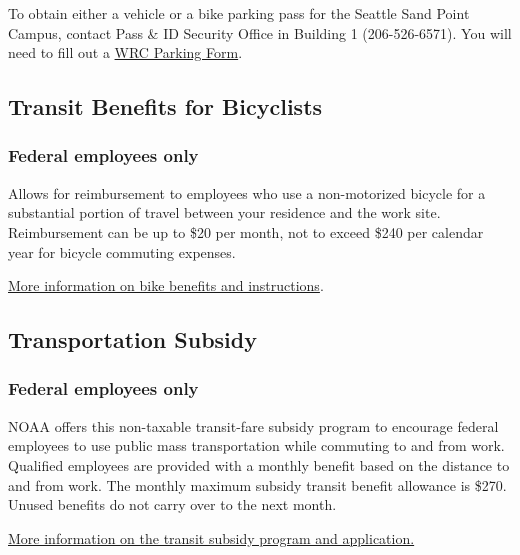 \documentclass[
  letterpaper,
  DIV=11,
  numbers=noendperiod]{scrreprt}
\begin{document}
To obtain either a vehicle or a bike parking pass for the Seattle Sand
Point Campus, contact Pass \& ID Security Office in Building 1
(206-526-6571). You will need to fill out a
\href{http://www.google.com/url?q=http\%3A\%2F\%2Fwww.wrc.noaa.gov\%2Fforms\%2FWRC\%2520Parking\%2520Decal\%2520v2008a.pdf&sa=D&sntz=1&usg=AOvVaw2YdnFqmKoV029T-pt6UwFj}{WRC
Parking Form}.

\subsection{Transit Benefits for
Bicyclists}\label{transit-benefits-for-bicyclists}

\subsubsection{Federal employees only}\label{federal-employees-only}

Allows for reimbursement to employees who use a non-motorized bicycle
for a substantial portion of travel between your residence and the work
site. Reimbursement can be up to \$20 per month, not to exceed \$240 per
calendar year for bicycle commuting expenses.

\href{https://sites.google.com/noaa.gov/cao/about-ocao/logistics-operations-division/noaa-transit-subsidy-program}{More
information on bike benefits and instructions}.

\subsection{Transportation Subsidy}\label{transportation-subsidy}

\subsubsection{Federal employees only}\label{federal-employees-only-1}

NOAA offers this non-taxable transit-fare subsidy program to encourage
federal employees to use public mass transportation while commuting to
and from work. Qualified employees are provided with a monthly benefit
based on the distance to and from work. The monthly maximum subsidy
transit benefit allowance is \$270. Unused benefits do not carry over to
the next month.

\href{https://sites.google.com/noaa.gov/cao/about-ocao/logistics-operations-division/noaa-transit-subsidy-program}{More
information on the transit subsidy program and application.}
\end{document}
